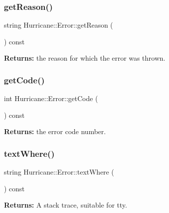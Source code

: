 \subsubsection{\texorpdfstring{get\+Reason()}{getReason()}}
{\footnotesize\ttfamily string Hurricane\+::\+Error\+::get\+Reason (\begin{DoxyParamCaption}{ }\end{DoxyParamCaption}) const\hspace{0.3cm}{\ttfamily [inline]}}

{\bfseries Returns\+:} the reason for which the error was thrown. \mbox{\label{classHurricane_1_1Error_a1ba11c6ba6eff9fdf2923520fe80a6b2}} 
\subsubsection{\texorpdfstring{get\+Code()}{getCode()}}
{\footnotesize\ttfamily int Hurricane\+::\+Error\+::get\+Code (\begin{DoxyParamCaption}{ }\end{DoxyParamCaption}) const\hspace{0.3cm}{\ttfamily [inline]}}

{\bfseries Returns\+:} the error code number. \mbox{\label{classHurricane_1_1Error_ab3b8bb521802f332340eaf0b37eb1dfc}} 
\subsubsection{\texorpdfstring{text\+Where()}{textWhere()}}
{\footnotesize\ttfamily string Hurricane\+::\+Error\+::text\+Where (\begin{DoxyParamCaption}{ }\end{DoxyParamCaption}) const\hspace{0.3cm}{\ttfamily [inline]}}

{\bfseries Returns\+:} A stack trace, suitable for tty. \mbox{\label{classHurricane_1_1Error_afafcbeae105f75906c7c45024de41c18}} 
